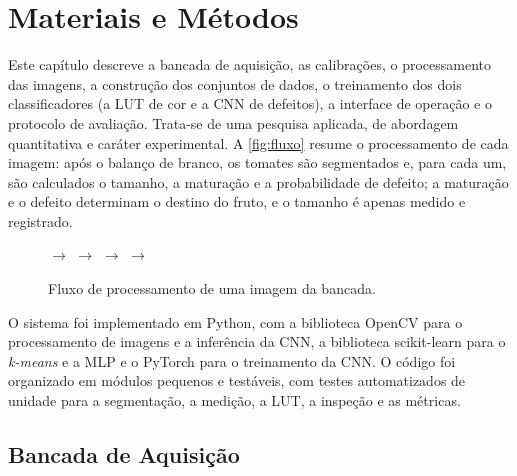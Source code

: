\chapter{Materiais e Métodos}\label{cap:metodos}

Este capítulo descreve a bancada de aquisição, as calibrações, o processamento das imagens, a construção dos conjuntos de dados, o treinamento dos dois classificadores (a LUT de cor e a CNN de defeitos), a interface de operação e o protocolo de avaliação. Trata-se de uma pesquisa aplicada, de abordagem quantitativa e caráter experimental. A \autoref{fig:fluxo} resume o processamento de cada imagem: após o balanço de branco, os tomates são segmentados e, para cada um, são calculados o tamanho, a maturação e a probabilidade de defeito; a maturação e o defeito determinam o destino do fruto, e o tamanho é apenas medido e registrado.

\begin{figure}[htb]
	\caption{\label{fig:fluxo}Fluxo de processamento de uma imagem da bancada.}
	\centering
	\small
	\setlength{\fboxsep}{4pt}
	 $\rightarrow$  $\rightarrow$  $\rightarrow$
	 $\rightarrow$ 
\end{figure}

O sistema foi implementado em Python, com a biblioteca OpenCV para o processamento de imagens e a inferência da CNN, a biblioteca scikit-learn para o \textit{k-means} e a MLP e o PyTorch para o treinamento da CNN. O código foi organizado em módulos pequenos e testáveis, com testes automatizados de unidade para a segmentação, a medição, a LUT, a inspeção e as métricas.

\section{Bancada de Aquisição}

